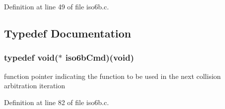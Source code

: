 Definition at line 49 of file iso6b.\-c.



\subsection{Typedef Documentation}
\subsubsection[{iso6b\-Cmd}]{\setlength{\rightskip}{0pt plus 5cm}typedef void($\ast$ iso6b\-Cmd)(void)}\label{iso6b_8c_a8d8a33233d8c4c9c7b3998aadb427360}
function pointer indicating the function to be used in the next collision arbitration iteration 

Definition at line 82 of file iso6b.\-c.

